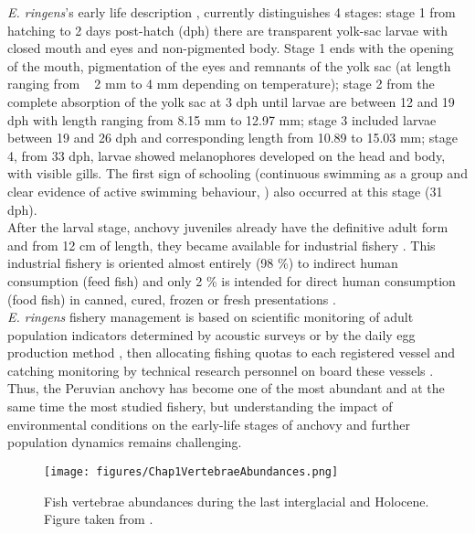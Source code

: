 \textit{E. ringens}’s early life description \citep{RiouOfel2021}, currently distinguishes 4 stages: stage 1 from hatching to 2 days post-hatch (dph) there are transparent yolk-sac larvae with closed mouth and eyes and non-pigmented body. Stage 1 ends with the opening of the mouth, pigmentation of the eyes and remnants of the yolk sac (at length ranging from ~ 2 mm to 4 mm depending on temperature); stage 2 from the complete absorption of the yolk sac at 3 dph until larvae are between 12 and 19 dph with length ranging from 8.15 mm to 12.97 mm; stage 3 included larvae between 19 and 26 dph and corresponding length from 10.89 to 15.03 mm; stage 4, from 33 dph, larvae showed melanophores developed on the head and body, with visible gills. The first sign of schooling (continuous swimming as a group and clear evidence of active swimming behaviour, \cite{Shaw1962}) also occurred at this stage (31 dph).\\

After the larval stage, anchovy juveniles already have the definitive adult form and from 12 cm of length, they became available for industrial fishery \citep{MarzShin2009}. This industrial fishery is oriented almost entirely (98 \%) to indirect human consumption (feed fish) and only 2 \% is intended for direct human consumption (food fish) in canned, cured, frozen or fresh presentations \citep{FreoSuei2014}.\\

\textit{E. ringens} fishery management is based on scientific monitoring of adult population indicators determined by acoustic surveys \citep{GutiSwar2007} or by the daily egg production method \citep{Ayon2000}, then allocating fishing quotas to each registered vessel and catching monitoring by technical research personnel on board these vessels \citep{KroeSanc2019}. Thus, the Peruvian anchovy has become one of the most abundant and at the same time the most studied fishery, but understanding the impact of environmental conditions on the early-life stages of anchovy and further population dynamics remains challenging.\\

\begin{figure}[ht]
	\texttt{[image: figures/Chap1VertebraeAbundances.png]}
	\centering
	\caption{Fish vertebrae abundances during the last interglacial and Holocene. Figure taken from \cite{Salv2022}.}
	\label{Chap1VertebraeAbundances}
\end{figure}

